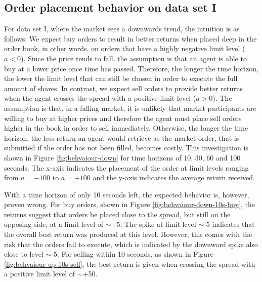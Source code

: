 \subsection{Order placement behavior on data set I}
For data set I, where the market sees a downwards trend, the intuition is as follows:
We expect buy orders to result in better returns when placed deep in the order book, in other words, on orders that have a highly negative limit level ($a<0$).
Since the price tends to fall, the assumption is that an agent is able to buy at a lower price once time has passed.
Therefore, the longer the time horizon, the lower the limit level that can still be chosen in order to execute the full amount of shares.
In contrast,  we expect sell orders to provide better returns when the agent crosses the spread with a positive limit level ($a>0$).
The assumption is that, in a falling market, it is unlikely that market participants are willing to buy at higher prices and therefore the agent must place sell orders higher in the book in order to sell immediately.
Otherwise, the longer the time horizon, the less return an agent would retrieve as the market order, that is submitted if the order has not been filled, becomes costly.
This investigation is shown in Figure \ref{fig:behvaiour-down} for time horizons of 10, 30, 60 and 100 seconds.
The x-axis indicates the placement of the order at limit levels ranging from $a=-100$ to $a=+100$ and the y-axis indicates the average return received.

With a time horizon of only 10 seconds left, the expected behavior is, however, proven wrong.
For buy orders, shown in Figure \ref{fig:behvaiour-down-10s-buy}, the returns suggest that orders be placed close to the spread, but still on the opposing side, at a limit level of $\sim$+5.
The spike at limit level $\sim$-5 indicates that the overall best return was produced at this level. However, this comes with the risk that the orders fail to execute, which is indicated by the downward spike also close to level $\sim$-5.
For selling within 10 seconds, as shown in Figure \ref{fig:behvaiour-up-10s-sell}, the best return is given when crossing the spread with a positive limit level of $\sim$+50.

